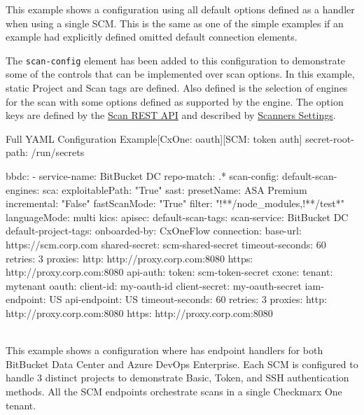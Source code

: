 This example shows a \cxoneflow configuration using all default options defined
as a handler when using a single SCM.  This is the same as one of the simple examples if
an example had explicitly defined omitted default connection elements.

The \texttt{scan-config} element has been added to this configuration to
demonstrate some of the controls that can be implemented over scan options.  In this
example, static Project and Scan tags are defined.  Also defined is the selection
of engines for the scan with some options defined as supported by the engine.  The
option keys are defined by the
\href{https://checkmarx.stoplight.io/docs/checkmarx-one-api-reference-guide/branches/main/f601dd9456e80-run-a-scan}{Scan REST API}
and described by
\href{https://checkmarx.com/resource/documents/en/34965-68598-global-settings.html#UUID-8e38f06b-45d4-ea7f-5ff5-50deb22e43aa_UUID-1a4211ec-dbf9-a180-cb20-59e1246ec3fb}{Scanners Settings}.


\begin{code}{Full YAML Configuration Example}{[CxOne: oauth]}{[SCM: token auth]}
secret-root-path: /run/secrets

bbdc:
    - service-name: BitBucket DC
      repo-match: .*
      scan-config:
          default-scan-engines:
              sca:
                  exploitablePath: "True"
              sast:
                  presetName: ASA Premium
                  incremental: "False"
                  fastScanMode: "True"
                  filter: "!**/node_modules,!**/test*"
                  languageMode: multi
              kics:
              apisec:
          default-scan-tags:
              scan-service: BitBucket DC
          default-project-tags:
              onboarded-by: CxOneFlow
      connection:
          base-url: https://scm.corp.com
          shared-secret: scm-shared-secret
          timeout-seconds: 60
          retries: 3
          proxies:
            http: http://proxy.corp.com:8080
            https: http://proxy.corp.com:8080
          api-auth:
              token: scm-token-secret
      cxone:
          tenant: mytenant
          oauth:
              client-id: my-oauth-id
              client-secret: my-oauth-secret
          iam-endpoint: US
          api-endpoint: US
          timeout-seconds: 60
          retries: 3
          proxies:
            http: http://proxy.corp.com:8080
            https: http://proxy.corp.com:8080
\end{code}


\noindent\\This example shows a configuration where \cxoneflow has endpoint handlers for both
BitBucket Data Center and Azure DevOps Enterprise.  Each SCM is configured to handle 3 distinct
projects to demonstrate Basic, Token, and SSH authentication methods.  All the SCM endpoints
orchestrate scans in a single Checkmarx One tenant.

